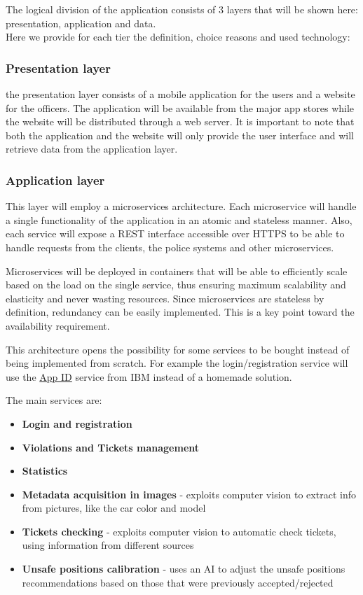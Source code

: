 The logical division of the application consists of 3 layers that will be shown here: presentation, application and data.
\\Here we provide for each tier the definition, choice reasons and used technology:
\subsubsection{Presentation layer}\label{presentationlayer}
the presentation layer consists of a mobile application for the users and a website for the officers.
The application will be available from the major app stores while the website will be distributed through a web server.
It is important to note that both the application and the website will only provide the user interface and will retrieve data from the application layer.

\subsubsection{Application layer}\label{applicationlayer}
This layer will employ a microservices architecture.
Each microservice will handle a single functionality of the application in an atomic and stateless manner.
Also, each service will expose a REST interface accessible over HTTPS to be able to handle requests from the clients, the police systems and other microservices.

Microservices will be deployed in containers that will be able to efficiently scale based on the load on the single service, thus ensuring maximum scalability and elasticity and never wasting resources.
Since microservices are stateless by definition, redundancy can be easily implemented. This is a key point toward the availability requirement.

This architecture opens the possibility for some services to be bought instead of being implemented from scratch. For example the login/registration service will use the \hyperlink{appidsafestreets}{App ID} service from IBM instead of a homemade solution.

The main services are:
\begin{itemize}
	\item \textbf{Login and registration}
	\item \textbf{Violations and Tickets management}
	\item \textbf{Statistics}
	\item \textbf{Metadata acquisition in images} - exploits computer vision to extract info from pictures, like the car color and model
	\item \textbf{Tickets checking} - exploits computer vision to automatic check tickets, using information from different sources
	\item \textbf{Unsafe positions calibration} - uses an AI to adjust the unsafe positions recommendations based on those that were previously accepted/rejected
\end{itemize}

